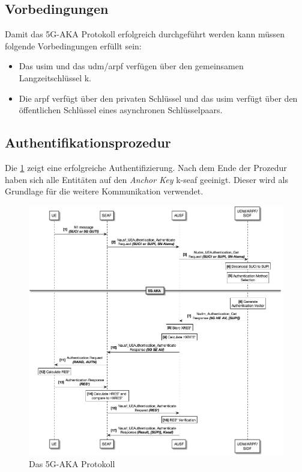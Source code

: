\subsection{Vorbedingungen}

Damit das 5G-AKA Protokoll erfolgreich durchgeführt werden kann müssen folgende Vorbedingungen erfüllt sein:

\begin{itemize}
\item Das \gls{usim} und das \gls{udm}/\gls{arpf} verfügen über den gemeinsamen Langzeitschlüssel \gls{k}.

\item Die \gls{arpf} verfügt über den privaten Schlüssel und das \gls{usim} verfügt über den öffentlichen Schlüssel eines asynchronen Schlüsselpaars.

\end{itemize}


\subsection{Authentifikationsprozedur}

Die \cref{fig:protocol_v1} zeigt eine erfolgreiche Authentifizierung.
Nach dem Ende der Prozedur haben sich alle Entitäten auf den \textit{Anchor Key} \gls{k-seaf} geeinigt.
Dieser wird als Grundlage für die weitere Kommunikation verwendet.

\begin{figure}[H]
  \centering
  \includegraphics[width=\textwidth]{uml/protocol_v1.png}
  \caption{Das 5G-AKA Protokoll}
  \label{fig:protocol_v1}
\end{figure}

